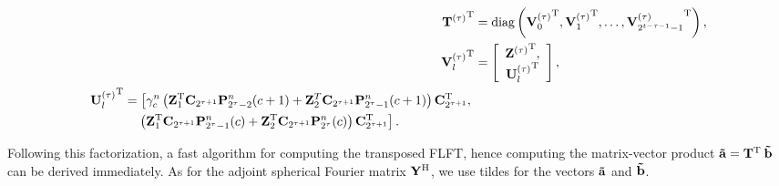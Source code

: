 \begin{align}
  \nonumber
  {\mathbf{T}^{(\tau)}}^{\text{\rm{T}}}   & = \text{diag}\left({\mathbf{V}^{(\tau)}_0}^{\text{\rm{T}}},{\mathbf{V}^{(\tau)}_1}^{\text{\rm{T}}},
  \dots,{\mathbf{V}^{(\tau)}_{2^{t-\tau-1}-1}}^{\text{\rm{T}}}\right),\\
  \nonumber
  {\mathbf{V}^{(\tau)}_l}^{\text{\rm{T}}} & = \left[ \begin{array}{c}
    {\mathbf{Z}^{(\tau)}}^{\text{\rm{T}}},\\ 
  \nonumber
  {\mathbf{U}^{(\tau)}_l}^{\text{\rm{T}}} \end{array} \right],\\
  \label{NFSFT:transposedUformula}
  \begin{split}
    {\mathbf{U}^{(\tau)}_l}^{\text{\rm{T}}} & =
      \left[\gamma_{c}^n \left( \mathbf{Z}_{1}^{\text{\rm{T}}} \mathbf{C}_{2^{\tau+1}} \mathbf{P}_{2^{\tau}-2}^n{\hspace{-0.4ex}}\left(c+1\right) +
      \mathbf{Z}_{2}^T \mathbf{C}_{2^{\tau+1}} \mathbf{P}_{2^{\tau}-1}^n{\hspace{-0.4ex}}\left(c+1\right) \right) \mathbf{C}_{2^{\tau+1}}^{\text{\rm{T}}},\right.\\
     & \quad \left. \left( \mathbf{Z}_{1}^{\text{\rm{T}}} \mathbf{C}_{2^{\tau+1}} \mathbf{P}_{2^{\tau}-1}^n{\hspace{-0.4ex}}\left(c\right) + \mathbf{Z}_{2}^{\text{\rm{T}}} 
     \mathbf{C}_{2^{\tau+1}} \mathbf{P}_{2^{\tau}}^n{\hspace{-0.4ex}}\left(c\right) \right) \mathbf{C}_{2^{\tau+1}}^{\text{\rm{T}}} \right].
  \end{split}
\end{align}

Following this factorization, a fast algorithm for computing the transposed FLFT, hence computing the matrix-vector 
product $\mathbf{\tilde{a}} = \mathbf{T}^{\text{\rm{T}}} \: \mathbf{\tilde{b}}$ can be derived immediately. 
As for the adjoint spherical Fourier matrix $\mathbf{Y}^{\text{\rm{H}}}$, we use tildes for the vectors $\mathbf{\tilde{a}}$ and $\mathbf{\tilde{b}}$.

